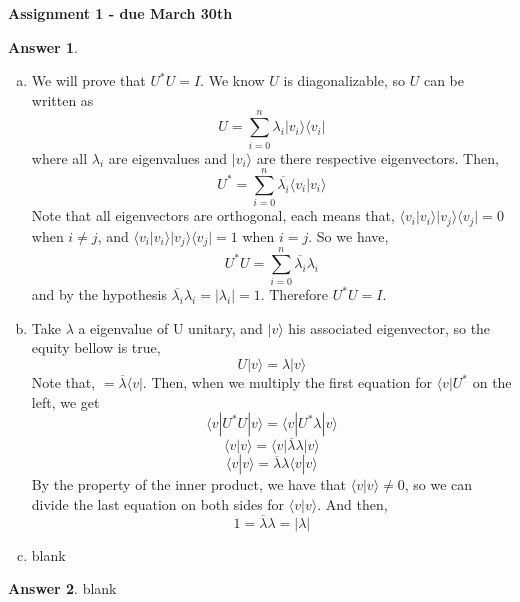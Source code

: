 \documentclass[12pt]{article}
\newcommand{\ket}[1]{|#1\rangle}
\newcommand{\bra}[1]{\langle#1|}
\newcommand{\ketbra}[2]{| #1 \rangle \langle #2 |}
\newcommand{\braket}[2]{\langle  #1 |#2 \rangle}
\theoremstyle{plain}
\theoremstyle{definition}
\newtheorem{ans}{Answer}
\begin{document}
\begin{center}
\Large \textbf{{Assignment 1 - due March 30th}}
\end{center} 


\begin{ans}
\begin{enumerate}[(a)]
 	\item We will prove that $U^{*}U = I$. We know $U$ is diagonalizable, so $U$ can be written as \[U = \sum_{i=0}^{n} \lambda_i \ketbra{v_i}{v_i}\] where
			all $\lambda_i$ are eigenvalues and $\ket{v_i}$ are there respective eigenvectors. 
			Then, \[ U^{*} = \sum_{i=0}^{n} \overline{\lambda_i} \braket{v_i}{v_i}\]
			Note that all eigenvectors are orthogonal, each means that, $\braket{v_i}{v_i} \ketbra{v_j}{v_j} = 0$ when $i \neq j$, and $\braket{v_i}{v_i} \ketbra{v_j}{v_j} = 1$
			when $i = j$. So we have, \[ U^{*}U = \sum_{i=0}^{n} \overline{\lambda_i} \lambda_i\] and by the hypothesis
			$\overline{\lambda_i} \lambda_i = \left\lvert \lambda_i \right\rvert = 1$. Therefore $ U^{*}U = I$.
 	\item Take $\lambda$ a eigenvalue of U unitary, and $\ket{v}$ his associated eigenvector, so the equity bellow
			is true, \[ U \ket{v} = \lambda\ket{v} \]
			Note that, $ = \overline{\lambda}\bra{v}$.
			Then, when we multiply the first equation for $\bra{v}U^{*}$ on the left, we get 
			\[ \bra{v}U^{*} U \ket{v} = \bra{v}U^{*} \lambda \ket{v}\]
			\[ \braket{v}{v} = \bra{v}\overline{\lambda}\lambda \ket{v}\]
			\[ \braket{v}{v} = \overline{\lambda}\lambda \braket{v}{v}\]
			By the property of the inner product, we have that $\braket{v}{v} \neq 0$, so we can divide the last
			equation on both sides for $\braket{v}{v}$. And then, 
			\[ 1 = \overline{\lambda}\lambda = \left\lvert \lambda \right\rvert\]
 	\item blank
 \end{enumerate}
 
\end{ans}

\noindent \hrulefill

\begin{ans}
	blank
\end{ans}

\noindent \hrulefill
\end{document}
